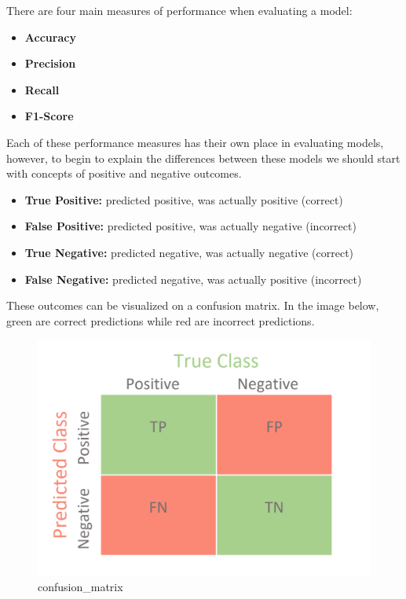 \documentclass[
  letterpaper,
  DIV=11,
  numbers=noendperiod]{scrreprt}
\providecommand{\tightlist}{%
  \setlength{\itemsep}{0pt}\setlength{\parskip}{0pt}}\usepackage{longtable,booktabs,array}
\begin{document}
There are four main measures of performance when evaluating a model:

\begin{itemize}
\tightlist
\item
  \textbf{Accuracy}
\item
  \textbf{Precision}
\item
  \textbf{Recall}
\item
  \textbf{F1-Score}
\end{itemize}

Each of these performance measures has their own place in evaluating
models, however, to begin to explain the differences between these
models we should start with concepts of positive and negative outcomes.

\begin{itemize}
\tightlist
\item
  \textbf{True Positive:} predicted positive, was actually positive
  (correct)
\item
  \textbf{False Positive:} predicted positive, was actually negative
  (incorrect)
\item
  \textbf{True Negative:} predicted negative, was actually negative
  (correct)
\item
  \textbf{False Negative:} predicted negative, was actually positive
  (incorrect)
\end{itemize}

These outcomes can be visualized on a confusion matrix. In the image
below, green are correct predictions while red are incorrect
predictions.

\begin{figure}

{\centering \includegraphics{images/confusion_matrix.png}

}

\caption{confusion\_matrix}

\end{figure}
\end{document}
